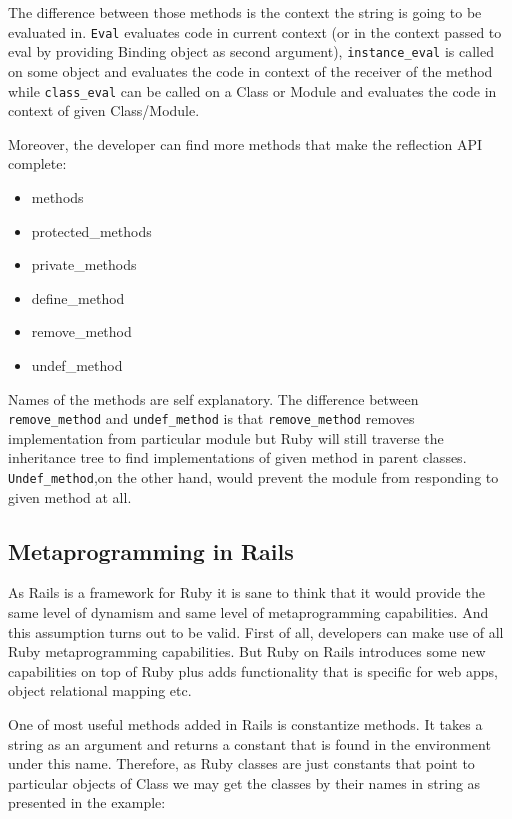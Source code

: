       The difference between those methods is the context the string is going to be evaluated in. 
      \texttt{Eval} evaluates code in current context (or in the context passed to eval by providing
      Binding object as second argument), \texttt{instance\_eval} is called on some object and evaluates
      the code in context of the receiver of the method while \texttt{class\_eval} can be called on a 
      Class or Module and evaluates the code in context of given Class/Module.
      
      Moreover, the developer can find more methods that make the reflection API complete:
      
        \begin{itemize}
          \item{methods}
          \item{protected\_methods}
          \item{private\_methods}
          \item{define\_method}
          \item{remove\_method}
          \item{undef\_method}
        \end{itemize}
      
      Names of the methods are self explanatory. The difference between \texttt{remove\_method}  and
      \texttt{undef\_method} is that \texttt{remove\_method} removes implementation from particular module 
      but Ruby will still traverse the inheritance tree to find implementations of given method in parent
      classes. \texttt{Undef\_method},on the other hand, would prevent the module from responding to given
      method at all.
      
    \subsection{Metaprogramming in Rails}
      As Rails is a framework for Ruby it is sane to think that it would provide the same level of
      dynamism and same level of metaprogramming capabilities. And this assumption turns out to be 
      valid. First of all, developers can make use of all Ruby metaprogramming capabilities. But Ruby on 
      Rails introduces some new capabilities on top of Ruby plus adds functionality that is specific for
      web apps, object relational mapping etc.
      
      One of most useful methods added in Rails is constantize methods. It takes a string as an argument and
      returns a constant that is found in the environment under this name. Therefore, as Ruby classes
      are just constants that point to particular objects of Class we may get the classes by their names
      in string as presented in the example:
      

